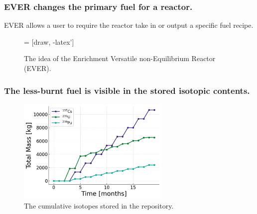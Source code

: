 \documentclass[9pt]{beamer}
\begin{document}
\begin{frame}
  \frametitle{EVER changes the primary fuel for a reactor.}
  EVER allows a user to require the reactor take in or output a specific fuel recipe.
  \begin{figure}
  \centering
     = [draw, -latex']
  \caption{The idea of the Enrichment Versatile non-Equilibrium Reactor (EVER).}
  \end{figure}
\end{frame}


\begin{frame}
  \frametitle{The less-burnt fuel is visible in the stored isotopic contents.}
  \begin{figure}
    \centering
    \includegraphics[width=0.65\textwidth]{images/mass_isotopes.png}
    \caption{The cumulative isotopes stored in the repository.}
  \end{figure}
\end{frame}
\end{document}
